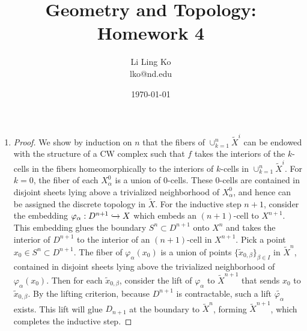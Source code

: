 \documentclass{article}
\begin{document}
\title{Geometry and Topology: Homework 4}
\author{Li Ling Ko\\ lko@nd.edu}
\date{\today}
\maketitle

\begin{enumerate}
  \item \begin{proof} We show by induction on $n$ that the fibers of
    $\cup_{k=1}^n\widetilde{X}^{i}$ can be endowed with the structure of a
    CW complex such that $f$ takes the interiors of the $k$-cells in the
    fibers homeomorphically to the interiors of $k$-cells in
    $\cup_{k=1}^n\widetilde{X}^{i}$. For $k=0$, the fiber of each
    $X^0_{\alpha}$ is a union of $0$-cells. These 0-cells are contained in
    disjoint sheets lying above a trivialized neighborhood of
    $X^0_{\alpha}$, and hence can be assigned the discrete topology in
    $\widetilde{X}$. For the inductive step $n+1$, consider the embedding
    $\varphi_\alpha:D^{n+1}\xhookrightarrow{}X$ which embeds an
    $(n+1)$-cell to $X^{n+1}$. This embedding glues the boundary
    $S^n\subset D^{n+1}$ onto $X^n$ and takes the interior of $D^{n+1}$ to
    the interior of an $(n+1)$-cell in $X^{n+1}$. Pick a point $x_0\in
    S^n\subset D^{n+1}$. The fiber of $\varphi_\alpha(x_0)$ is a union of
    points $\{\widetilde{x}_{0,\beta}\}_{\beta\in I}$ in $\widetilde{X}^n$,
    contained in disjoint sheets lying above the trivialized neighborhood
    of $\varphi_\alpha(x_0)$. Then for each $\widetilde{x}_{0,\beta}$,
    consider the lift of $\varphi_\alpha$ to $\widetilde{X}^{n+1}$ that
    sends $x_0$ to $\widetilde{x}_{0,\beta}$. By the lifting criterion,
    because $D^{n+1}$ is contractable, such a lift
    $\widetilde{\varphi_\alpha}$ exists. This lift will glue $D_{n+1}$ at
    the boundary to $\widetilde{X}^n$, forming $\widetilde{X}^{n+1}$, which
    completes the inductive step.
  \end{proof}
\end{enumerate}
\end{document}

